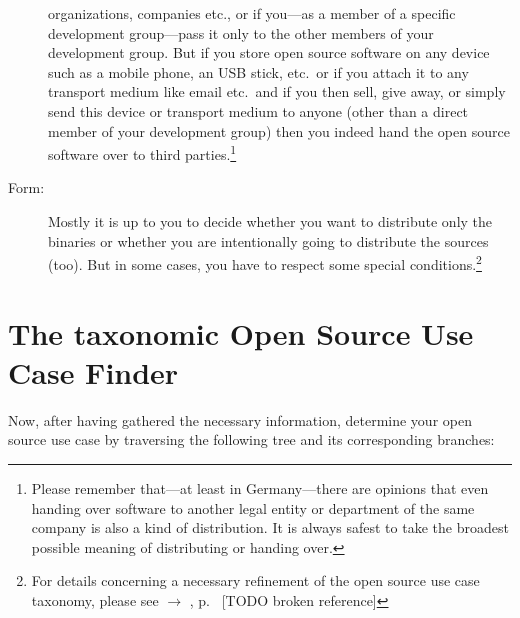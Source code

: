 \begin{description}
organizations, companies etc., or if you---as a member of a specific
development group---pass it only to the other members of your development
group. But if you store open source software on any device such as a mobile
phone, an USB stick, etc.\ or if you attach it to any transport medium like
email etc.\ and if you then sell, give away, or simply send this device or
transport medium to anyone (other than a direct member of your development
group) then you indeed hand the open source software over to third
parties.\footnote{Please remember that---at least in Germany---there are
opinions that even handing over software to another legal entity or department
of the same company is also a kind of distribution. It is always safest to take
the broadest possible meaning of distributing or handing over.}
\item[Form:] Mostly it is up to you to decide whether you want to distribute
only the binaries or whether you are intentionally going to distribute the
sources (too). But in some cases, you have to respect some special
conditions.\footnote{For details concerning a necessary refinement of the open
source use case taxonomy, please see $\rightarrow$ \oslic{}, p.\
\pageref{sec:SourceBinaryDifference} [TODO broken reference]}
\end{description}

\section{The taxonomic Open Source Use Case Finder}

Now, after having gathered the necessary information, determine your 
open source use case by traversing the following tree and its corresponding
branches:

